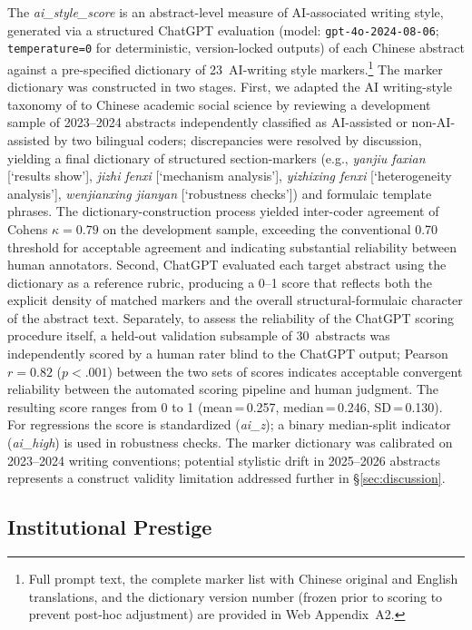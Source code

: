 \documentclass[12pt,a4paper]{article}
\begin{document}
The \textit{ai\_style\_score} is an abstract-level measure of AI-associated
writing style, generated via a structured ChatGPT evaluation (model:
\texttt{gpt-4o-2024-08-06}; \texttt{temperature=0} for
deterministic, version-locked outputs) of each Chinese abstract
against a pre-specified dictionary of 23~AI-writing style markers.\footnote{Full prompt text, the complete
  marker list with Chinese original and English translations, and the
  dictionary version number (frozen prior to scoring to prevent
  post-hoc adjustment) are provided in Web Appendix~A2.}
The marker dictionary was constructed in two stages.
First, we adapted the AI writing-style taxonomy of \citet{Liang2024}
to Chinese academic social science by reviewing a development sample
of 2023--2024 abstracts independently classified as AI-assisted
or non-AI-assisted by two bilingual coders; discrepancies were resolved
by discussion, yielding a final dictionary of structured section-markers
(e.g., \textit{yanjiu faxian} [`results show'],
\textit{jizhi fenxi} [`mechanism analysis'],
\textit{yizhixing fenxi} [`heterogeneity analysis'],
\textit{wenjianxing jianyan} [`robustness checks'])
and formulaic template phrases.
The dictionary-construction process yielded inter-coder agreement of
Cohen\textquotesingle s $\kappa = 0.79$ on the development sample,
exceeding the conventional 0.70 threshold for acceptable agreement
and indicating substantial reliability between human annotators.
Second, ChatGPT evaluated each target abstract using the dictionary
as a reference rubric, producing a 0--1 score that reflects both
the explicit density of matched markers and the overall
structural-formulaic character of the abstract text.
Separately, to assess the reliability of the ChatGPT scoring procedure
itself, a held-out validation subsample of 30~abstracts was
independently scored by a human rater blind to the ChatGPT output;
Pearson $r = 0.82$ ($p < .001$) between the two sets of scores
indicates acceptable convergent reliability between the automated
scoring pipeline and human judgment.
The resulting score ranges from 0 to 1
(mean\,=\,0.257, median\,=\,0.246, SD\,=\,0.130).
For regressions the score is standardized (\textit{ai\_z}); a binary
median-split indicator (\textit{ai\_high}) is used in robustness checks.
The marker dictionary was calibrated on 2023--2024 writing conventions;
potential stylistic drift in 2025--2026 abstracts represents a
construct validity limitation addressed further in §\ref{sec:discussion}.

\subsection{Institutional Prestige}
\end{document}
